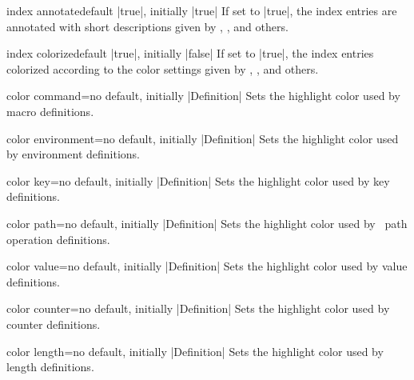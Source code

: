 \clearpage

\begin{docTcbKey}{index annotate}{}{default |true|, initially |true|}
  If set to |true|, the index entries are annotated with short descriptions
  given by , ,
  and others.
\end{docTcbKey}

\begin{docTcbKey}{index colorize}{}{default |true|, initially |false|}
  If set to |true|, the index entries colorized according to the color
  settings given by , ,
  and others.
\end{docTcbKey}


\begin{docTcbKey}{color command}{=}{no default, initially |Definition|}
  Sets the highlight color used by macro definitions.
\end{docTcbKey}

\begin{docTcbKey}{color environment}{=}{no default, initially |Definition|}
  Sets the highlight color used by environment definitions.
\end{docTcbKey}

\begin{docTcbKey}{color key}{=}{no default, initially |Definition|}
  Sets the highlight color used by key definitions.
\end{docTcbKey}

\begin{docTcbKey}[][doc new={2019-09-18}]{color path}{=}{no default, initially |Definition|}
  Sets the highlight color used by \tikzname\ path operation definitions.
\end{docTcbKey}

\begin{docTcbKey}{color value}{=}{no default, initially |Definition|}
  Sets the highlight color used by value definitions.
\end{docTcbKey}

\begin{docTcbKey}[][doc new={2015-01-08}]{color counter}{=}{no default, initially |Definition|}
  Sets the highlight color used by counter definitions.
\end{docTcbKey}

\begin{docTcbKey}[][doc new={2015-01-08}]{color length}{=}{no default, initially |Definition|}
  Sets the highlight color used by length definitions.
\end{docTcbKey}

